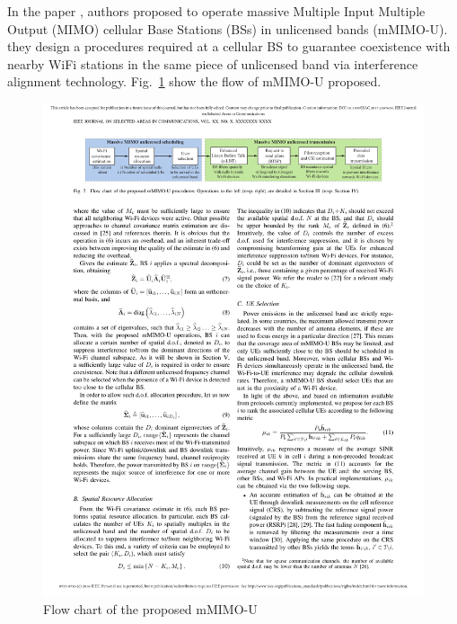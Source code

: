\documentclass[12pt, onecolumn]{IEEEtran}
\begin{document}
In the paper \cite{geraci2017operating}, authors proposed to operate massive Multiple Input Multiple Output (MIMO) cellular Base Stations (BSs) in unlicensed bands (mMIMO-U). they design a procedures required at a cellular BS to guarantee coexistence with nearby WiFi stations in the same piece of unlicensed band via interference alignment technology.  Fig.~\ref{FIG:mMIMO} show the flow of mMIMO-U  proposed.
\begin{figure}[H]
    \centering\includegraphics[width=1\columnwidth]{mMIMO.pdf}
    \caption{ Flow chart of the proposed mMIMO-U}\label{FIG:mMIMO}
\end{figure}
\end{document}
